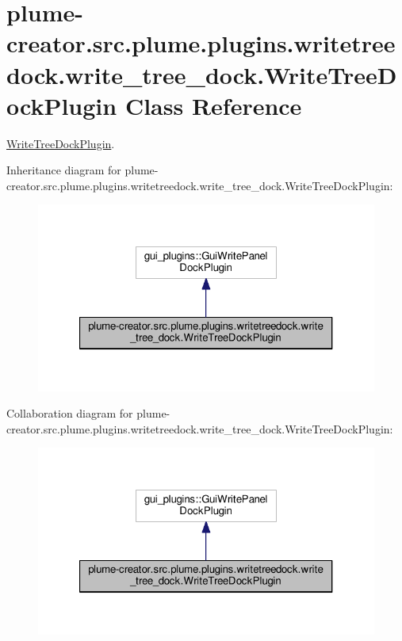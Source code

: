 \hypertarget{classplume-creator_1_1src_1_1plume_1_1plugins_1_1writetreedock_1_1write__tree__dock_1_1_write_tree_dock_plugin}{}\section{plume-\/creator.src.\+plume.\+plugins.\+writetreedock.\+write\+\_\+tree\+\_\+dock.\+Write\+Tree\+Dock\+Plugin Class Reference}
\label{classplume-creator_1_1src_1_1plume_1_1plugins_1_1writetreedock_1_1write__tree__dock_1_1_write_tree_dock_plugin}


\hyperlink{classplume-creator_1_1src_1_1plume_1_1plugins_1_1writetreedock_1_1write__tree__dock_1_1_write_tree_dock_plugin}{Write\+Tree\+Dock\+Plugin}.  




Inheritance diagram for plume-\/creator.src.\+plume.\+plugins.\+writetreedock.\+write\+\_\+tree\+\_\+dock.\+Write\+Tree\+Dock\+Plugin\+:\nopagebreak
\begin{figure}[H]
\begin{center}
\leavevmode
\includegraphics[width=321pt]{classplume-creator_1_1src_1_1plume_1_1plugins_1_1writetreedock_1_1write__tree__dock_1_1_write_tree_dock_plugin__inherit__graph}
\end{center}
\end{figure}


Collaboration diagram for plume-\/creator.src.\+plume.\+plugins.\+writetreedock.\+write\+\_\+tree\+\_\+dock.\+Write\+Tree\+Dock\+Plugin\+:\nopagebreak
\begin{figure}[H]
\begin{center}
\leavevmode
\includegraphics[width=321pt]{classplume-creator_1_1src_1_1plume_1_1plugins_1_1writetreedock_1_1write__tree__dock_1_1_write_tree_dock_plugin__coll__graph}
\end{center}
\end{figure}
